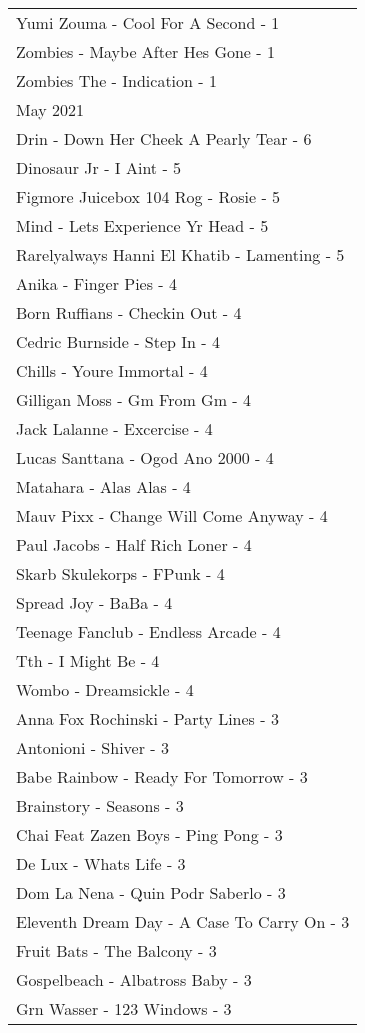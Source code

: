 \documentclass[
]{article}
\begin{document}
\begin{longtable}{l}
Yumi Zouma - Cool For A Second - 1 \\ 
Zombies - Maybe After Hes Gone - 1 \\ 
Zombies The - Indication - 1 \\ 
\midrule
\multicolumn{1}{l}{May 2021} \\ 
\midrule
Drin - Down Her Cheek A Pearly Tear - 6 \\ 
Dinosaur Jr - I Aint - 5 \\ 
Figmore Juicebox 104 Rog - Rosie - 5 \\ 
Mind - Lets Experience Yr Head - 5 \\ 
Rarelyalways Hanni El Khatib - Lamenting - 5 \\ 
Anika - Finger Pies - 4 \\ 
Born Ruffians - Checkin Out - 4 \\ 
Cedric Burnside - Step In - 4 \\ 
Chills - Youre Immortal - 4 \\ 
Gilligan Moss - Gm From Gm - 4 \\ 
Jack Lalanne - Excercise - 4 \\ 
Lucas Santtana - Ogod Ano 2000 - 4 \\ 
Matahara - Alas Alas - 4 \\ 
Mauv Pixx - Change Will Come Anyway - 4 \\ 
Paul Jacobs - Half Rich Loner - 4 \\ 
Skarb Skulekorps - FPunk - 4 \\ 
Spread Joy - BaBa - 4 \\ 
Teenage Fanclub - Endless Arcade - 4 \\ 
Tth - I Might Be - 4 \\ 
Wombo - Dreamsickle - 4 \\ 
Anna Fox Rochinski - Party Lines - 3 \\ 
Antonioni - Shiver - 3 \\ 
Babe Rainbow - Ready For Tomorrow - 3 \\ 
Brainstory - Seasons - 3 \\ 
Chai Feat Zazen Boys - Ping Pong - 3 \\ 
De Lux - Whats Life - 3 \\ 
Dom La Nena - Quin Podr Saberlo - 3 \\ 
Eleventh Dream Day - A Case To Carry On - 3 \\ 
Fruit Bats - The Balcony - 3 \\ 
Gospelbeach - Albatross Baby - 3 \\ 
Grn Wasser - 123 Windows - 3 \\ 

\end{longtable}
\end{document}
